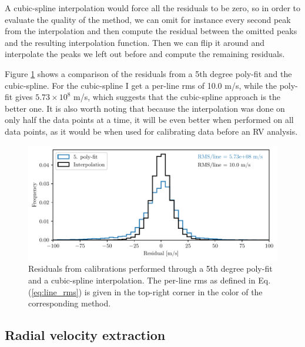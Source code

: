     A cubic-spline interpolation would force all the residuals to be zero, so in order to evaluate the quality of the method, we can omit for instance every second peak from the interpolation and then compute the residual between the omitted peaks and the resulting interpolation function. Then we can flip it around and interpolate the peaks we left out before and compute the remaining residuals. 

    Figure \ref{fig:calib_poly_vs_interp} shows a comparison of the residuals from a 5th degree poly-fit and the cubic-spline. For the cubic-spline I get a per-line rms of 10.0 m/s, while the poly-fit gives $5.73 \times 10^8$ m/s, which suggests that the cubic-spline approach is the better one. It is also worth noting that because the interpolation was done on only half the data points at a time, it will be even better when performed on all data points, as it would be when used for calibrating data before an RV analysis.

    \begin{figure}%
        \begin{wide}  
            \includegraphics[width=\textwidth]{figures/calib/hist_peak_residuals_poly_and_interp.pdf}
            \caption{Residuals from calibrations performed through a 5th degree poly-fit and a cubic-spline interpolation. The per-line rms as defined in Eq. (\ref{eq:line_rms}) is given in the top-right corner in the color of the corresponding method.}
            \label{fig:calib_poly_vs_interp}
        \end{wide}
    \end{figure}



\subsection{Radial velocity extraction}

